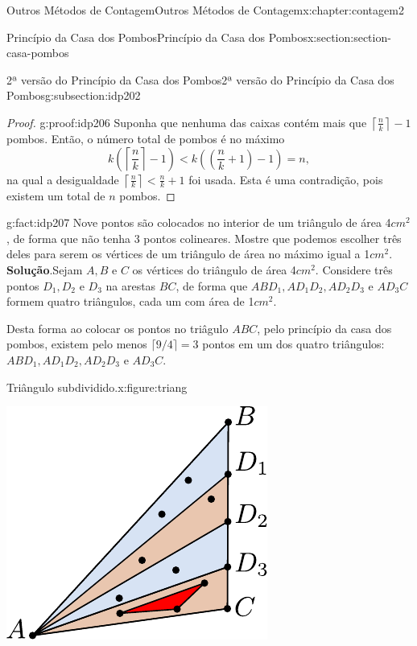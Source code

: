 \documentclass[oneside,10pt,]{book}
\newcommand{\blocktitlefont}{\relax}
\numberwithin{equation}{section}
\newcommand{\lt}{<}
\begin{document}
\begin{chapterptx}{Outros Métodos de Contagem}{}{Outros Métodos de Contagem}{}{}{x:chapter:contagem2}
\begin{sectionptx}{Princípio da Casa dos Pombos}{}{Princípio da Casa dos Pombos}{}{}{x:section:section-casa-pombos}
\begin{subsectionptx}{2ª versão do Princípio da Casa dos Pombos}{}{2ª versão do Princípio da Casa dos Pombos}{}{}{g:subsection:idp202}
\begin{proof}{}{g:proof:idp206}
Suponha que nenhuma das caixas contém mais que \(\left\lceil \frac{n}{k} \right\rceil-1\) pombos. Então, o número total de pombos é no máximo%
\begin{equation*}
k\left(\left\lceil \frac{n}{k} \right\rceil-1\right) \lt k\left( \left( \frac{n}{k} +1 \right) -1 \right) = n, 
\end{equation*}
na qual a desigualdade \(\left\lceil \frac{n}{k} \right\rceil \lt  \frac{n}{k} +1 \) foi usada. Esta é uma contradição, pois existem um total de \(n\) pombos.%
\end{proof}
\begin{fact}{}{}{g:fact:idp207}%
Nove pontos são colocados no interior de um triângulo de área 4\(cm^2\), de forma que não tenha 3 pontos colineares. Mostre que podemos escolher três deles para serem os vértices de um triângulo de área no máximo igual a 1\(cm^2\).%
\textbf{\blocktitlefont Solução}.\quad{}Sejam \(A, B\) e \(C\) os vértices do triângulo de área 4\(cm^2\). Considere três pontos \(D_1, D_2\) e \(D_3\) na arestas \(BC\), de forma que \(ABD_1, AD_1D_2,  AD_2D_3\) e \(AD_3C\) formem quatro triângulos, cada um com área de 1\(cm^2\).%
\par
Desta forma ao colocar os pontos no triâgulo \(ABC\), pelo princípio da casa dos pombos, existem pelo menos \(\lceil 9/4 \rceil = 3\) pontos em um dos quatro triângulos: \(ABD_1, AD_1D_2,  AD_2D_3\) e \(AD_3C\).%
\begin{figureptx}{Triângulo subdividido.}{x:figure:triang}{}%
\begin{image}{0.35}{0.3}{0.35}%
\includegraphics[width=\linewidth]{images/triang}

\end{image}
\end{figureptx}
\end{fact}
\end{subsectionptx}
\end{sectionptx}
\end{chapterptx}
\end{document}
